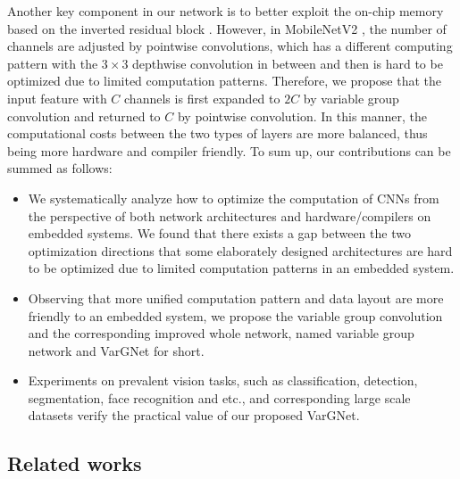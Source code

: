 \documentclass{article}
\begin{document}
Another key component in our network is to better exploit the on-chip memory based on the inverted residual block \cite{sandler2018mobilenetv2}. 
However, in MobileNetV2 \cite{sandler2018mobilenetv2}, the number of channels are adjusted by pointwise convolutions, which has a different computing pattern with the $3\times 3$ depthwise convolution in between and then is hard to be optimized due to limited computation patterns. Therefore, we propose that the input feature with $C$ channels is first expanded to $2C$ by variable group convolution and returned to $C$ by pointwise convolution. In this manner, the computational costs between the two types of layers are more balanced, thus being more hardware and compiler friendly. To sum up, our contributions can be summed as follows:
\begin{itemize}
\item We systematically analyze how to optimize the computation of CNNs from the perspective of both network architectures and hardware/compilers on embedded systems. We found that there exists a gap between the two optimization directions that some elaborately designed architectures are hard to be optimized due to limited computation patterns in an embedded system.
\item Observing that more unified computation pattern and data layout are more friendly to an embedded system, we propose the variable group convolution and the corresponding improved whole network, named variable group network and VarGNet for short.
\item Experiments on prevalent vision tasks, such as classification, detection, segmentation, face recognition and etc., and corresponding large scale datasets verify the practical value of our proposed VarGNet.
\end{itemize}


\subsection{Related works}
\end{document}
